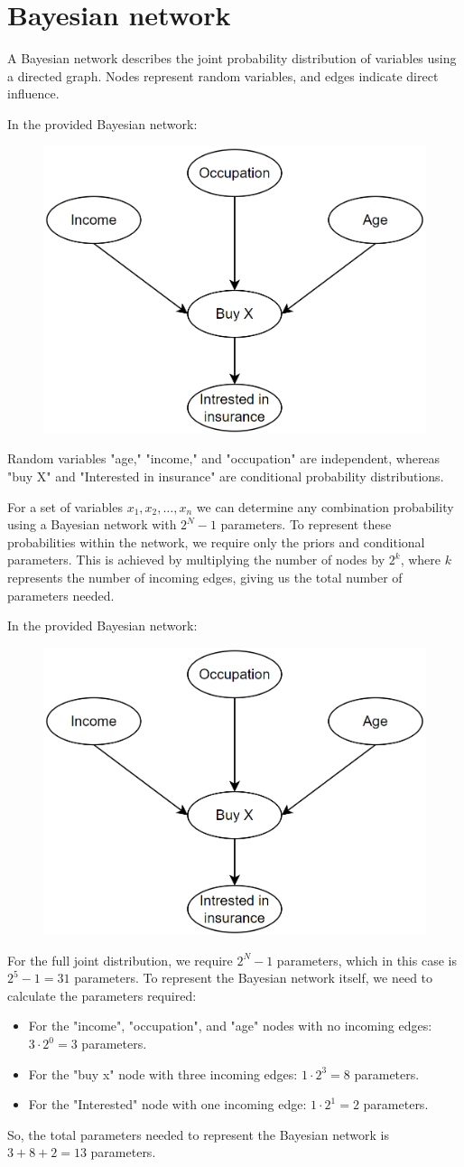 \section{Bayesian network}

A Bayesian network describes the joint probability distribution of variables using a directed graph. 
Nodes represent random variables, and edges indicate direct influence.
\begin{example}
    In the provided Bayesian network:
    \begin{figure}[H]
        \centering
        \includegraphics[width=0.4\linewidth]{images/insurance.png}
    \end{figure}
    Random variables "age," "income," and "occupation" are independent, whereas "buy X" and "Interested in insurance" are conditional probability distributions.
\end{example}
For a set of variables $x_1, x_2, \ldots, x_n$ we can determine any combination probability using a Bayesian network with $2^N - 1$ parameters. 
To represent these probabilities within the network, we require only the priors and conditional parameters. 
This is achieved by multiplying the number of nodes by $2^k$, where $k$ represents the number of incoming edges, giving us the total number of parameters needed.
\begin{example}
    In the provided Bayesian network:
    \begin{figure}[H]
        \centering
        \includegraphics[width=0.4\linewidth]{images/insurance.png}
    \end{figure}
    For the full joint distribution, we require $2^N - 1$ parameters, which in this case is $2^5 - 1 = 31$ parameters.
    To represent the Bayesian network itself, we need to calculate the parameters required:
    \begin{itemize}
        \item For the "income", "occupation", and "age" nodes with no incoming edges: $3 \cdot 2^0 = 3$ parameters.
        \item For the "buy x" node with three incoming edges: $1 \cdot 2^3 = 8$ parameters.
        \item For the "Interested" node with one incoming edge: $1 \cdot 2^1 = 2$ parameters.
    \end{itemize}
    So, the total parameters needed to represent the Bayesian network is $3 + 8 + 2 = 13$ parameters.
\end{example}
